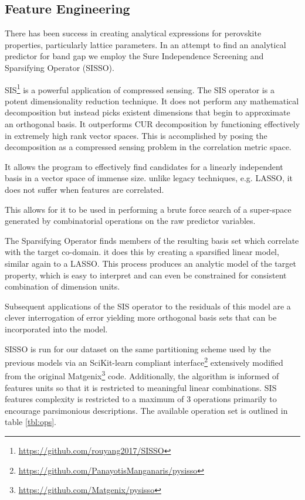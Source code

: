 \subsection{Feature Engineering}
\label{sec:org65b0d16}
There has been success in creating analytical expressions for perovskite properties, particularly lattice parameters.
\autocite{jiang-2006-predic-lattic} In an attempt to find an analytical predictor for band gap we employ the Sure Independence Screening and Sparsifying Operator (SISSO).
\autocite{ouyang-2018-sisso} 

SIS\footnote{\url{https://github.com/rouyang2017/SISSO}} is a powerful application of compressed sensing.
\autocite{ghiringhelli-2017-learn-physic}
The SIS operator is a potent dimensionality reduction technique.
It does not perform any mathematical decomposition but instead picks existent dimensions that begin to approximate an orthogonal basis.
It outperforms CUR decomposition by functioning effectively in extremely high rank vector spaces.
\autocite{ray-2021-various-dimen,hamm-2019-cur-decom}
This is accomplished by posing the decomposition as a compressed sensing problem in the correlation metric space.

It allows the program to effectively find candidates for a linearly independent basis in a vector space of immense size.
unlike legacy techniques, e.g.
LASSO, it does not suffer when features are correlated.
\autocite{tibshirani-1996-regres-shrin,gauraha-2018-introd-to-lasso}

This allows for it to be used in performing a brute force search of a super-space generated by combinatorial operations on the raw predictor variables.

The Sparsifying Operator finds members of the resulting basis set which correlate with the target co-domain.
it does this by creating a sparsified linear model, similar again to a LASSO.
This process produces an analytic model of the target property, which is easy to interpret and can even be constrained for consistent combination of dimension units.

Subsequent applications of the SIS operator to the residuals of this model are a clever interrogation of error yielding more orthogonal basis sets that can be incorporated into the model.
\autocite{mayo-1998-error-growt}

SISSO is run for our dataset on the same partitioning scheme used by the previous models via an SciKit-learn compliant \autocite{buitinck-2013-api} interface\footnote{\url{https://github.com/PanayotisManganaris/pysisso}} extensively modified from the original Matgenix\footnote{\url{https://github.com/Matgenix/pysisso}} code.
Additionally, the algorithm is informed of features units so that it is restricted to meaningful linear combinations.
SIS features complexity is restricted to a maximum of 3 operations primarily to encourage parsimonious descriptions.
The available operation set is outlined in table \ref{tbl:ops}.

